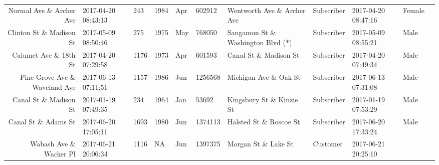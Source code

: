 \documentclass[11pt]{article}
\begin{document}
\begin{tabular}{r|llllllllll}
	 Normal Ave \& Archer Ave           & 2017-04-20 08:43:13                 &  243                                & 1984                                & Apr                                 &  602912                             & Wentworth Ave \& Archer Ave        & Subscriber                          & 2017-04-20 08:47:16                 & Female                             \\
	 Clinton St \& Madison St           & 2017-05-09 08:50:46                 &  275                                & 1975                                & May                                 &  768050                             & Sangamon St \& Washington Blvd (*) & Subscriber                          & 2017-05-09 08:55:21                 & Male                               \\
	 Calumet Ave \& 18th St             & 2017-04-20 07:29:58                 & 1176                                & 1973                                & Apr                                 &  601593                             & Canal St \& Madison St             & Subscriber                          & 2017-04-20 07:49:34                 & Male                               \\
	 Pine Grove Ave \& Waveland Ave     & 2017-06-13 07:11:51                 & 1157                                & 1986                                & Jun                                 & 1256568                             & Michigan Ave \& Oak St             & Subscriber                          & 2017-06-13 07:31:08                 & Male                               \\
	 Canal St \& Madison St             & 2017-01-19 07:49:35                 &  234                                & 1964                                & Jan                                 &   53692                             & Kingsbury St \& Kinzie St          & Subscriber                          & 2017-01-19 07:53:29                 & Male                               \\
	 Canal St \& Adams St               & 2017-06-20 17:05:11                 & 1693                                & 1980                                & Jun                                 & 1374113                             & Halsted St \& Roscoe St            & Subscriber                          & 2017-06-20 17:33:24                 & Male                               \\
	 Wabash Ave \& Wacker Pl            & 2017-06-21 20:06:34                 & 1116                                &   NA                                & Jun                                 & 1397375                             & Morgan St \& Lake St               & Customer                            & 2017-06-21 20:25:10                 &                                    \\

\end{tabular}
\end{document}
